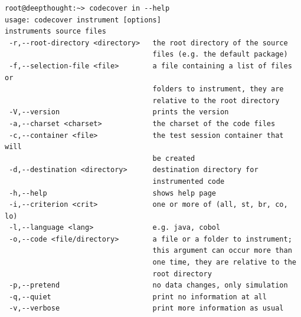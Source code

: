 \begin{verbatim}
root@deepthought:~> codecover in --help
usage: codecover instrument [options]
instruments source files
 -r,--root-directory <directory>   the root directory of the source 
                                   files (e.g. the default package)
 -f,--selection-file <file>        a file containing a list of files or
                                   folders to instrument, they are
                                   relative to the root directory
 -V,--version                      prints the version
 -a,--charset <charset>            the charset of the code files
 -c,--container <file>             the test session container that will
                                   be created
 -d,--destination <directory>      destination directory for 
                                   instrumented code
 -h,--help                         shows help page
 -i,--criterion <crit>             one or more of (all, st, br, co, lo)
 -l,--language <lang>              e.g. java, cobol
 -o,--code <file/directory>        a file or a folder to instrument;
                                   this argument can occur more than 
                                   one time, they are relative to the
                                   root directory
 -p,--pretend                      no data changes, only simulation
 -q,--quiet                        print no information at all
 -v,--verbose                      print more information as usual
\end{verbatim}